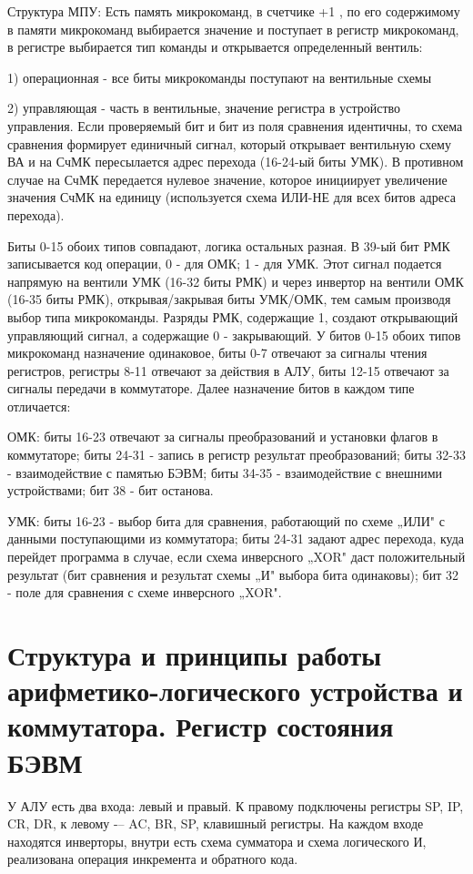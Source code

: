 \documentclass{article}
\begin{document}
Структура МПУ: Есть память микрокоманд, в счетчике +1 , по его содержимому в памяти микрокоманд выбирается значение и поступает в регистр микрокоманд, 
в регистре выбирается тип команды и открывается определенный вентиль: 

1) операционная - все биты микрокоманды поступают на вентильные схемы 

2) управляющая -  часть в вентильные, значение регистра в устройство управления. 
Если проверяемый бит и бит из поля сравнения идентичны, то схема сравнения формирует единичный сигнал, который открывает вентильную схему ВА и на СчМК пересылается адрес перехода (16-24-ый биты УМК).
В противном случае на СчМК передается нулевое значение, которое инициирует увеличение значения СчМК на единицу (используется схема ИЛИ-НЕ для всех битов адреса перехода).


Биты 0-15 обоих типов совпадают, логика остальных разная. В 39-ый бит РМК записывается код операции, 0 - для ОМК; 1 - для УМК. Этот сигнал подается напрямую на вентили УМК (16-32 биты РМК) и через инвертор на вентили ОМК (16-35 биты РМК), открывая/закрывая биты УМК/ОМК, тем самым производя выбор типа микрокоманды.
Разряды РМК, содержащие 1, создают открывающий управляющий сигнал, а содержащие 0 - закрывающий. У битов 0-15 обоих типов микрокоманд назначение одинаковое, биты 0-7 отвечают за сигналы чтения регистров, регистры 8-11 отвечают за действия в АЛУ, биты 12-15 отвечают за сигналы передачи в коммутаторе. Далее назначение битов в каждом типе отличается:

ОМК: биты 16-23 отвечают за сигналы преобразований и установки флагов в
коммутаторе; биты 24-31 - запись в регистр результат преобразований; биты 32-33 - взаимодействие с памятью БЭВМ; биты 34-35 - взаимодействие с внешними устройствами; бит 38 - бит останова.


УМК: биты 16-23 - выбор бита для сравнения, работающий по схеме „ИЛИ" с данными поступающими из коммутатора; биты 24-31 задают адрес перехода, куда перейдет программа в случае, если схема инверсного „XOR" даст положительный результат (бит сравнения и результат схемы „И" выбора бита одинаковы); бит 32 - поле для сравнения с схеме инверсного „XOR".
\section{Структура и принципы работы арифметико-логического устройства и коммутатора. Регистр состояния БЭВМ}

У АЛУ есть два входа: левый и правый. К правому подключены регистры SP, IP, CR, DR, к левому -– AC, BR, SP, клавишный регистры. 
На каждом входе находятся инверторы, внутри есть схема сумматора и схема логического И, реализована операция инкремента и обратного кода. 
\end{document}
